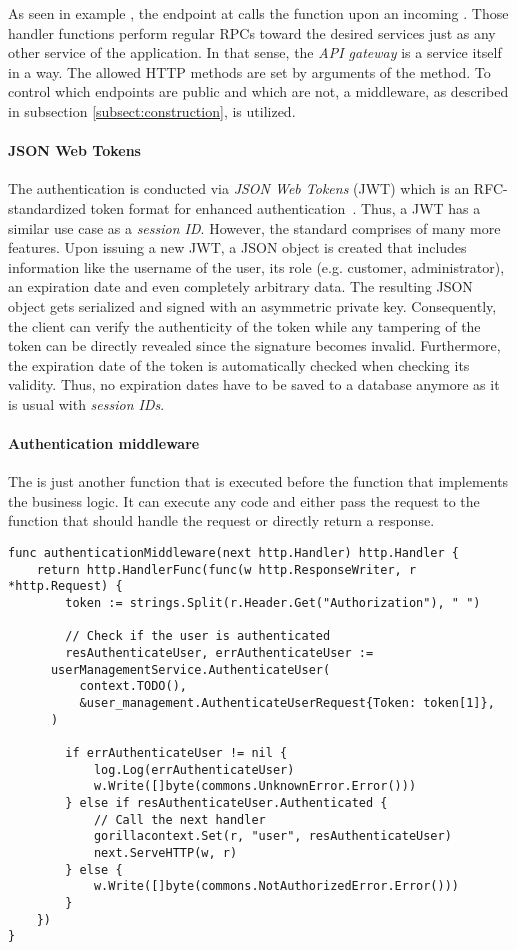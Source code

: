 \documentclass[12pt,a4paper,twoside]{report}
\begin{document}
As seen in example , the endpoint at 
calls the function  upon an incoming .
Those handler functions perform regular RPCs toward the desired services just
as any other service of the application. In that sense, the \textit{API gateway}
is a service itself in a way.
The allowed HTTP methods are set by arguments of the  method.
To control which endpoints are public and which are not, a middleware, as described
in subsection \ref{subsect:construction}, is utilized.

\paragraph{JSON Web Tokens}
The authentication is conducted via \textit{JSON Web Tokens} (JWT) which is
an RFC-standardized token format for enhanced authentication~\cite{jwt-rfc}.
Thus, a JWT has a similar use case as a \textit{session ID}.
However, the standard comprises of many more features.
Upon issuing a new JWT, a JSON object is created that includes information
like the username of the user, its role (e.g. customer, administrator), an
expiration date and even completely arbitrary data.
The resulting JSON object gets serialized and signed with an asymmetric
private key. Consequently, the client can verify the authenticity of the token
while any tampering of the token can be directly revealed since the signature becomes
invalid. Furthermore, the expiration date of the token is automatically checked
when checking its validity. Thus, no expiration dates have to be saved to
a database anymore as it is usual with \textit{session IDs}.

\paragraph{Authentication middleware}
The  is just another function that is executed
before the function that implements the business logic.
It can execute any code and either pass the request to the function that should
handle the request or directly return a response.

\begin{lstlisting}[title=api-gateway/middlewares.go, float, floatplacement=H]
func authenticationMiddleware(next http.Handler) http.Handler {
	return http.HandlerFunc(func(w http.ResponseWriter, r *http.Request) {
		token := strings.Split(r.Header.Get("Authorization"), " ")

		// Check if the user is authenticated
		resAuthenticateUser, errAuthenticateUser :=
      userManagementService.AuthenticateUser(
          context.TODO(),
          &user_management.AuthenticateUserRequest{Token: token[1]},
      )

		if errAuthenticateUser != nil {
			log.Log(errAuthenticateUser)
			w.Write([]byte(commons.UnknownError.Error()))
		} else if resAuthenticateUser.Authenticated {
			// Call the next handler
			gorillacontext.Set(r, "user", resAuthenticateUser)
			next.ServeHTTP(w, r)
		} else {
			w.Write([]byte(commons.NotAuthorizedError.Error()))
		}
	})
}
\end{lstlisting}
\end{document}
